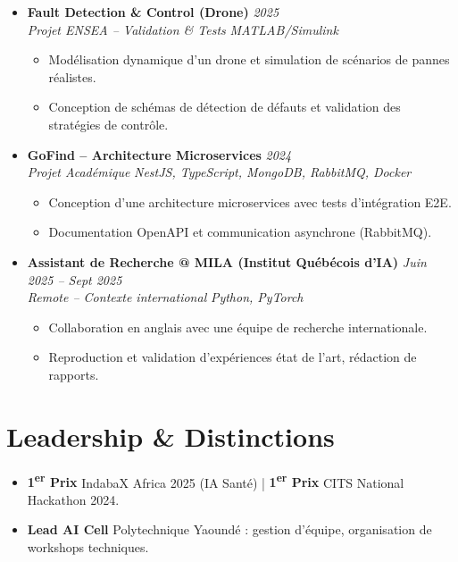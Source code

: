 \documentclass[a4paper,11pt]{article}
\begin{document}
\begin{itemize}[leftmargin=*, label={-}]
\item \textbf{Fault Detection \& Control (Drone)} \hfill \textit{2025} \\
\textit{Projet ENSEA -- Validation \& Tests} \hfill \textit{MATLAB/Simulink}
\vspace{-2pt}
    \begin{itemize}[leftmargin=0.4cm, nosep, label=\tiny$\bullet$]
        \item \small{Modélisation dynamique d'un drone et simulation de scénarios de pannes réalistes.}
        \item \small{Conception de schémas de détection de défauts et validation des stratégies de contrôle.}
    \end{itemize}
\vspace{3pt}

\item \textbf{GoFind -- Architecture Microservices} \hfill \textit{2024} \\
\textit{Projet Académique} \hfill \textit{NestJS, TypeScript, MongoDB, RabbitMQ, Docker}
\vspace{-2pt}
    \begin{itemize}[leftmargin=0.4cm, nosep, label=\tiny$\bullet$]
        \item \small{Conception d'une architecture microservices avec tests d'intégration E2E.}
        \item \small{Documentation OpenAPI et communication asynchrone (RabbitMQ).}
    \end{itemize}
\vspace{3pt}

\item \textbf{Assistant de Recherche @ MILA (Institut Québécois d'IA)} \hfill \textit{Juin 2025 -- Sept 2025} \\
\textit{Remote -- Contexte international} \hfill \textit{Python, PyTorch}
\vspace{-2pt}
    \begin{itemize}[leftmargin=0.4cm, nosep, label=\tiny$\bullet$]
        \item \small{Collaboration en anglais avec une équipe de recherche internationale.}
        \item \small{Reproduction et validation d'expériences état de l'art, rédaction de rapports.}
    \end{itemize}
\vspace{3pt}

\end{itemize}

\section{Leadership \& Distinctions}
\begin{itemize}[leftmargin=*, label=\tiny$\bullet$, nosep]
    \item \small{\textbf{1\textsuperscript{er} Prix} IndabaX Africa 2025 (IA Santé) | \textbf{1\textsuperscript{er} Prix} CITS National Hackathon 2024.}
    \item \small{\textbf{Lead AI Cell} Polytechnique Yaoundé : gestion d'équipe, organisation de workshops techniques.}
\end{itemize}
\end{document}
